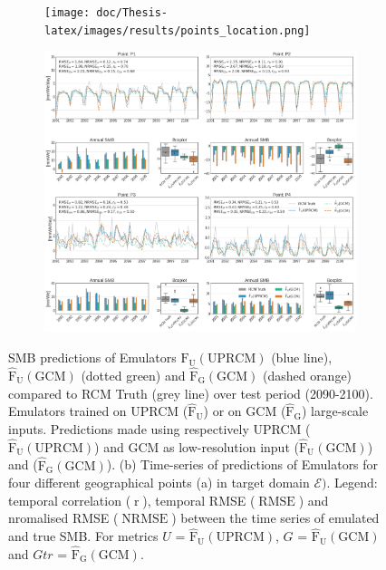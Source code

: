 \documentclass[a4paper,11pt,oneside]{report}
\begin{document}
\begin{figure}[tbp]
        \centering
        \begin{subfigure}[b]{0.2\columnwidth}
            \centering \texttt{[image: doc/Thesis-latex/images/results/points\_location.png]}
            \caption[]%
            {{\small}}    
          \label{fig:points-location}
        \end{subfigure}
        \hfill
        \begin{subfigure}[b]{\columnwidth}  
            \centering 
           \includegraphics[width=\textwidth]{doc/Thesis-latex/images/results/timeseries_RCM_GCM.pdf}
            \caption[]%
            {{\small }}  
          \label{fig:timeseries-GCM-UPRCM}
        \end{subfigure}
        \hfill
        \caption[]
        {\small SMB predictions of Emulators $\mathrm{\hat{F}_{U}(UPRCM)}$ (blue line), $\mathrm{\hat{F}_{U}(GCM)}$ (dotted green) and $\mathrm{\mathrm{\hat{F}_{G}(GCM)}}$ (dashed orange) compared to RCM Truth (grey line) over test period (2090-2100). Emulators trained on UPRCM ($\mathrm{\hat{F}_{U}}$) or on GCM ($\mathrm{\hat{F}_{G}}$) large-scale inputs. Predictions made using respectively UPRCM ($\mathrm{\hat{F}_{U}(UPRCM)}$) and GCM as low-resolution input ($\mathrm{\hat{F}_{U}(GCM)}$) and ($\mathrm{\hat{F}_{G}(GCM)}$). 
        (b) Time-series of predictions of Emulators for four different geographical points (a) in target domain $\mathcal{E})$. Legend: temporal correlation ($\operatorname{r}$), temporal RMSE ($\operatorname{RMSE}$) and nromalised RMSE ($\operatorname{NRMSE}$) between the time series of emulated and true SMB. For metrics $U$ = $\mathrm{\hat{F}_{U}(UPRCM)}$, $G$ = $\mathrm{\hat{F}_{U}(GCM)}$ and $Gtr$ = $\mathrm{\hat{F}_{G}(GCM)}$.} 
        \label{fig:points-timeseries-GCM-UPRCM}
    \end{figure}
\end{document}
